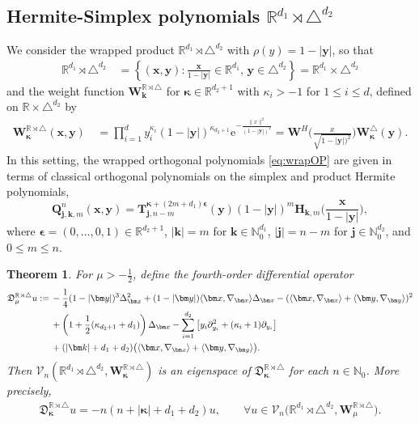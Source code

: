 \documentclass{amsart}
\newtheorem{thm}{Theorem}[section]
\theoremstyle{remark}
\def\la{{\langle}}
\def\ra{{\rangle}}
\def\e{\mathrm{e}}
\def\fD{{\mathfrak D}}
\def\k{{\kappa}}
\def\la{{\langle}}
\def\ra{{\rangle}}
\def\kb{{\bm k}}
\def\xb{{\bm x}}
\def\yb{{\bm y}}
\def\Tb{{\bm T}}
\def\Wb{{\bm W}}
\def\CV{{\mathcal V}}
\def\NN{{\mathbb N}}
\def\RR{{\mathbb R}}
\def\bep{{\boldsymbol{\epsilon}}}
\def\bk{{\boldsymbol{\kappa}}}
\def\f{\frac}
\begin{document}
\subsection{Hermite-Simplex polynomials $\RR^{d_1}  \rtimes \triangle^{d_2}$}
We consider the wrapped product  $\RR^{d_1}  \rtimes \triangle^{d_2}$ with $\rho(y) = 1-|\yb|$, so that 
\begin{align*}
\RR^{d_1}  \rtimes \triangle^{d_2}\, & = \left\{(\xb,\yb): \frac{\xb}{1-|\yb|} \in  \RR^{d_1},  \, \yb \in \triangle^{d_2}\right\} 
 = \RR^{d_1} \times \triangle^{d_2}
\end{align*}
and the weight function $\Wb_{\kb}^{\RR \rtimes \triangle}$ for $\bk \in \RR^{d_2+1}$ with $\k_i > -1$ for $1 \le i \le d$, 
defined on $\RR \times \triangle^{d_2}$ by  
\begin{align} \label{eq:W-RT}
\Wb_{\bk}^{\RR \rtimes \triangle}(\xb,\yb) \, & =  \prod_{i=1}^d y_i^{\k_i} (1-|\yb|)^{\k_{d_2+1}} \e^{ - \frac{\|x\|^2}{(1-|\yb|)^2}}
   =\Wb^H \bigg(\frac{x}{\sqrt{1-|\yb|)^2}} \bigg) \Wb_{\bk}^\triangle(\yb).
\end{align}
In this setting, the wrapped orthogonal polynomials \eqref{eq:wrapOP} are given in terms of classical orthogonal 
polynomials on the simplex and product Hermite polynomials, 
 \begin{equation} \label{eq:OP_RT}
 \bm Q_{\bm j, \bm k, m}^n(\bm x,\bm y) = \Tb_{\bm j, n-m}^{\bk+(2m+d_1)\bep}(\bm y) (1-|\bm y|)^m   
      \bm H_{\bm k, m}  \bigg(\frac{\bm x}{1-|\bm y|} \bigg),
\end{equation}
where $\bep =(0,\ldots, 0, 1) \in \RR^{d_2+1}$, $|\bm k| = m$ for $\bm k \in \NN_0^{d_1}$, $|\bm j| = n-m$ for $\bm j \in \NN_0^{d_2}$, 
and $0 \le m  \le n$. 

\begin{thm}\label{thm:RT}
For $\mu > -\f12$, define the fourth-order differential operator 
\begin{align} \label{eq:RT}
  \fD_{\mu}^{\RR \rtimes \triangle} u: = \,& -\frac14 (1-|\yb|)^3 \Delta_{\xb}^2 + (1-|\yb|) \la \xb,\nabla_\xb\ra \Delta_\xb 
   - (\la \xb,\nabla_\xb\ra + \la \yb,\nabla_\yb\ra) ^2  \\
   & +  \left(1+ \frac{1}{2} (\k_{d_2+1} + d_1)\right) \Delta_\xb - 
     \sum_{i=1}^{d_2} \left[ y_i \partial_{y_i}^2 + (\k_i+1) \partial_{y_i} \right] \notag \\
    & + (|\kb|+d_1+d_2) \big( \la \xb,\nabla_\xb\ra+ \la \yb,\nabla_\yb\ra\big). \notag
\end{align}
Then $\CV_n(\RR^{d_1}  \rtimes \triangle^{d_2}, \bm W_{\bk}^{\RR \rtimes \triangle})$ is an eigenspace 
of $ \fD_{\bk}^{\RR \rtimes \triangle}$ for each $n \in \NN_0$. More precisely, 
\begin{align} \label{eq:RT-eigen}
  \fD_{\bk}^{\RR \rtimes \triangle} u =  - n (n+ |\bk|+  d_1 + d_2) u, \qquad 
         \forall u \in \CV_n\big(\RR^{d_1}  \rtimes \triangle^{d_2}, \bm W_{\mu}^{\RR \rtimes \triangle}\big).
\end{align}
\end{thm}
\end{document}
